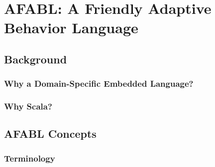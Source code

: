 \chapter{AFABL: A Friendly Adaptive Behavior Language}\label{ch:afabl}

\section{Background}

\subsection{Why a Domain-Specific Embedded Language?}

\subsection{Why Scala?}

\section{AFABL Concepts}

\subsection{Terminology}

